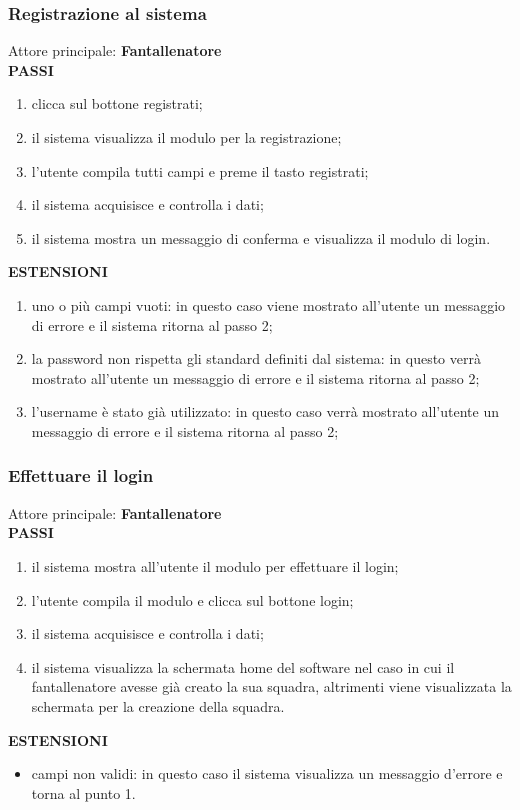 \documentclass[12pt,a4paper]{article}
\begin{document}
\subsubsection{Registrazione al sistema}
Attore principale: \textbf{Fantallenatore}\\
\newline
\textbf{PASSI}
\begin{enumerate}
\item clicca sul bottone registrati;
\item il sistema visualizza il modulo per la registrazione;
\item l'utente compila tutti campi e preme il tasto registrati;
\item il sistema acquisisce e controlla i dati;
\item il sistema mostra un messaggio di conferma e visualizza il modulo di login.
\end{enumerate}
\textbf{ESTENSIONI}
\begin{enumerate}
\item uno o più campi vuoti: in questo caso viene mostrato all'utente un messaggio di errore e il sistema ritorna al passo 2;
\item la password non rispetta gli standard definiti dal sistema: in questo verrà mostrato all'utente un messaggio di errore e il sistema ritorna al passo 2;
\item l'username è stato già utilizzato: in questo caso verrà mostrato all'utente un messaggio di errore e il sistema ritorna al passo 2;
\end{enumerate}
\subsubsection{Effettuare il login}
Attore principale: \textbf{Fantallenatore}\\
\newline
\textbf{PASSI}
\begin{enumerate}
\item il sistema mostra all'utente il modulo per effettuare il login;
\item l'utente compila il modulo e clicca sul bottone login;
\item il sistema acquisisce e controlla i dati;
\item il sistema visualizza la schermata home del software nel caso in cui il fantallenatore avesse già creato la sua squadra, altrimenti viene visualizzata la schermata per la creazione della squadra.
\end{enumerate}
\textbf{ESTENSIONI}
\begin{itemize}
\item campi non validi: in questo caso il sistema visualizza un messaggio d'errore e torna al punto 1.
\end{itemize}
\end{document}
